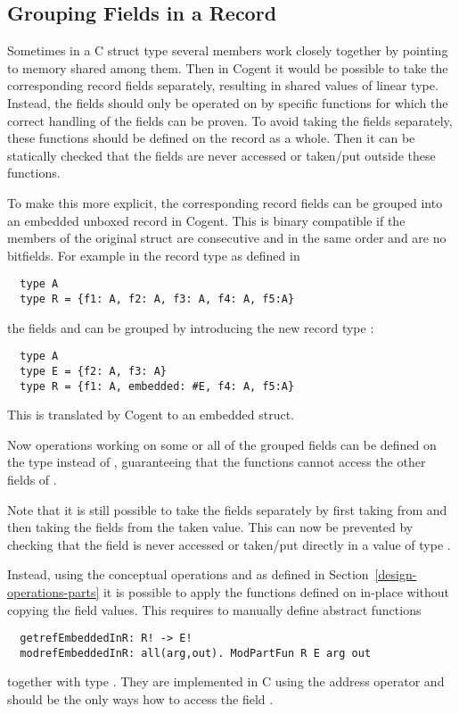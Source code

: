 \subsection{Grouping Fields in a Record}
\label{app-transtype-group}

Sometimes in a C struct type several members work closely together by pointing to memory
shared among them. Then in Cogent it would be possible to take the corresponding record fields separately,
resulting in shared values of linear type. Instead, the fields should only be operated on by specific functions
for which the correct handling of the fields can be proven. To avoid taking the fields separately, these
functions should be defined on the record as a whole. Then it can be statically checked that the fields
are never accessed or taken/put outside these functions.

To make this more explicit, the corresponding record fields can be grouped into an embedded unboxed
record in Cogent. This is binary compatible if the members of the original struct are consecutive and in
the same order and are no bitfields. For example in the record type  as defined in 
\begin{verbatim}
  type A
  type R = {f1: A, f2: A, f3: A, f4: A, f5:A}
\end{verbatim}
the fields  and  can be grouped by introducing the new record type :
\begin{verbatim}
  type A
  type E = {f2: A, f3: A}
  type R = {f1: A, embedded: #E, f4: A, f5:A}
\end{verbatim}
This is translated by Cogent to an embedded struct.

Now operations working on some or all of the grouped fields can be defined on the type  instead
of , guaranteeing that the functions cannot access the other fields of .

Note that it is still possible to take the fields separately by first taking  from 
and then taking the fields from the taken value. This can now be prevented by checking that the field
 is never accessed or taken/put directly in a value of type .

Instead, using the conceptual operations  and  as defined in 
Section~\ref{design-operations-parts}
it is possible to apply the functions defined on  in-place without copying the field values.
This requires to manually define abstract functions
\begin{verbatim}
  getrefEmbeddedInR: R! -> E!
  modrefEmbeddedInR: all(arg,out). ModPartFun R E arg out
\end{verbatim}
together with type . They are implemented in C using the address operator \code{\&} and should
be the only ways how to access the field .

